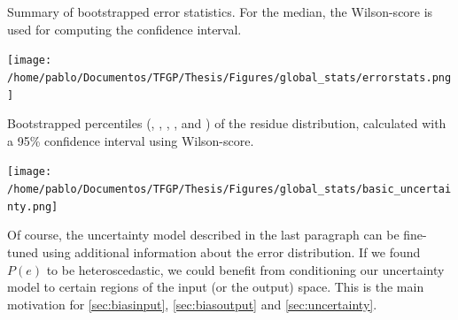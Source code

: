 %
\begin{table}
		\centering
		\caption{Summary of bootstrapped error statistics. For the median, the Wilson-score\cite{wilson1927probable} is used for computing the confidence interval.}
		\texttt{[image: /home/pablo/Documentos/TFGP/Thesis/Figures/global\_stats/errorstats.png]}
		\label{tab:errorstats}
\end{table}
\begin{table}
		\centering
		\caption{Bootstrapped percentiles (, , , ,  and ) of the residue distribution, calculated with a 95\% confidence interval using Wilson-score.}
		\texttt{[image: /home/pablo/Documentos/TFGP/Thesis/Figures/global\_stats/basic\_uncertainty.png]}
		\label{tab:basicuncertainty}
\end{table}
%
\indent Of course, the uncertainty model described in the last paragraph can be fine-tuned using additional information about the error distribution. If we found $P(e)$ to be heteroscedastic, we could benefit from conditioning our uncertainty model to certain regions of the input (or the output) space. This is the main motivation for \autoref{sec:biasinput}, \autoref{sec:biasoutput} and \autoref{sec:uncertainty}.\\
%
\clearpage
\mbox{}
\clearpage
